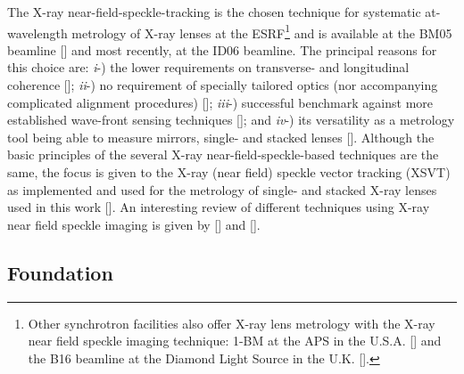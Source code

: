 \begin{refsection}
The X-ray near-field-speckle-tracking is the chosen technique for systematic at-wavelength metrology of X-ray lenses at the ESRF\footnote{Other synchrotron facilities also offer X-ray lens metrology with the X-ray near field speckle imaging technique: 1-BM at the APS in the U.S.A. [\cite{Qiao2020}] and the B16 beamline at the Diamond Light Source in the U.K. [\cite{Sawhney2013}].} and is available at the BM05 beamline [\cite{Berujon2020a}] and most recently, at the ID06 beamline. The principal reasons for this choice are: \textit{i}-) the lower requirements on transverse- and longitudinal coherence [\cite{Zanette2014,Zdora2015,Wang2016}]; \textit{ii}-) no requirement of specially tailored optics (nor accompanying complicated alignment procedures) [\cite{Morgan2012,Wang2016}]; \textit{iii}-) successful benchmark against more established wave-front sensing techniques [\cite{Kashyap2016,Romell2017}]; and \textit{iv}-) its versatility as a metrology tool being able to measure mirrors, single- and stacked lenses [\cite{Berujon2020a}]. Although the basic principles of the several X-ray near-field-speckle-based techniques are the same, the focus is given to the X-ray (near field) speckle vector tracking (XSVT) as implemented and used for the metrology of single- and stacked X-ray lenses used in this work [\cite{Berujon2020a,Berujon2020}]. An interesting review of different techniques using X-ray near field speckle imaging is given by [\cite{Zdora2018a}] and [\cite{Berujon2020}].

\subsection{Foundation}\label{sec:foundation}


\end{refsection}

